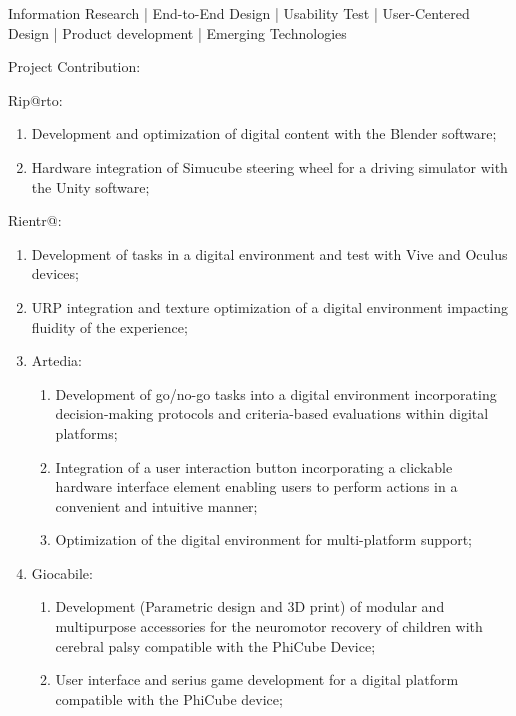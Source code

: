 {Information Research | End-to-End Design | Usability Test | User-Centered Design | Product development | Emerging Technologies
\newline{}
\item Project Contribution:
\item  Rip@rto: \begin{enumerate} 
                \item Development and optimization of digital content with the Blender software;
                \item Hardware integration of Simucube steering wheel for a driving simulator with the Unity software;
                \end{enumerate}
\item Rientr@: \begin{enumerate} 
                \item Development of tasks in a digital environment and test with Vive and Oculus devices;
                \item URP integration and texture optimization of a digital environment impacting fluidity of the experience;
\item Artedia:\begin{enumerate} 
                \item Development of go/no-go tasks into a digital environment incorporating decision-making protocols and criteria-based evaluations within digital platforms;
                \item Integration of a user interaction button incorporating a clickable hardware interface element enabling users to perform actions in a convenient and intuitive manner;
                \item Optimization of the digital environment for multi-platform support;
                \end{enumerate}
\item Giocabile:\begin{enumerate}
                \item Development (Parametric design and 3D print) of modular and multipurpose accessories for the neuromotor recovery of children with cerebral palsy compatible with the PhiCube Device;
                \item User interface and serius game development for a digital platform compatible with the PhiCube device;

\end{enumerate}
\end{enumerate}}
